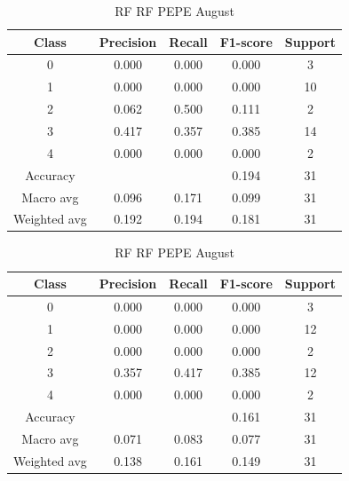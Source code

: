 \begin{enumerate}
\begin{enumerate}
                \begin{table}[H]
                \centering
                \scriptsize
                \begin{minipage}{0.48\textwidth}
                \centering
                \begin{tabular}{c|cccc}
                \hline
                Class & Precision & Recall & F1-score & Support \\
                \hline
                0 & 0.000 & 0.000 & 0.000 & 3 \\
                1 & 0.000 & 0.000 & 0.000 & 10 \\
                2 & 0.062 & 0.500 & 0.111 & 2 \\
                3 & 0.417 & 0.357 & 0.385 & 14 \\
                4 & 0.000 & 0.000 & 0.000 & 2 \\
                \hline
                Accuracy &       &      & 0.194 & 31 \\
                Macro avg & 0.096 & 0.171 & 0.099 & 31 \\
                Weighted avg & 0.192 & 0.194 & 0.181 & 31 \\
                \hline
                \end{tabular}
                \caption{RF RF DOGE August}
                \label{tab:classifier_2_report_rf_rf_doge_non_filtered_aug}
                \end{minipage}%
                \hfill
                \begin{minipage}{0.48\textwidth}
                \centering
                \begin{tabular}{c|cccc}
                \hline
                Class & Precision & Recall & F1-score & Support \\
                \hline
                0 & 0.000 & 0.000 & 0.000 & 3 \\
                1 & 0.000 & 0.000 & 0.000 & 12 \\
                2 & 0.000 & 0.000 & 0.000 & 2 \\
                3 & 0.357 & 0.417 & 0.385 & 12 \\
                4 & 0.000 & 0.000 & 0.000 & 2 \\
                \hline
                Accuracy &       &      & 0.161 & 31 \\
                Macro avg & 0.071 & 0.083 & 0.077 & 31 \\
                Weighted avg & 0.138 & 0.161 & 0.149 & 31 \\
                \hline
                \end{tabular}
                \caption{RF RF PEPE August}
                \label{tab:classifier_2_report_rf_rf_pepe_non_filtered_aug}
                \end{minipage}
                

\end{table}
\end{enumerate}
\end{enumerate}
